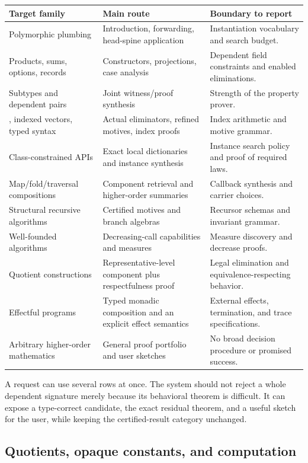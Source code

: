 \documentclass[11pt,letterpaper]{article}
\newcommand{\code}[1]{\texttt{\detokenize{#1}}}
\theoremstyle{definition}
\theoremstyle{remark}
\begin{document}
\begin{longtable}{@{}p{}p{}p{}@{}}
\toprule
Target family & Main route & Boundary to report\\
\midrule
\endhead
Polymorphic plumbing & Introduction, forwarding, head-spine application & Instantiation vocabulary and search budget.\\
Products, sums, options, records & Constructors, projections, case analysis & Dependent field constraints and enabled eliminations.\\
Subtypes and dependent pairs & Joint witness/proof synthesis & Strength of the property prover.\\
\code{Fin}, indexed vectors, typed syntax & Actual eliminators, refined motives, index proofs & Index arithmetic and motive grammar.\\
Class-constrained APIs & Exact local dictionaries and instance synthesis & Instance search policy and proof of required laws.\\
Map/fold/traversal compositions & Component retrieval and higher-order summaries & Callback synthesis and carrier choices.\\
Structural recursive algorithms & Certified motives and branch algebras & Recursor schemas and invariant grammar.\\
Well-founded algorithms & Decreasing-call capabilities and measures & Measure discovery and decrease proofs.\\
Quotient constructions & Representative-level component plus respectfulness proof & Legal elimination and equivalence-respecting behavior.\\
Effectful programs & Typed monadic composition and an explicit effect semantics & External effects, termination, and trace specifications.\\
Arbitrary higher-order mathematics & General proof portfolio and user sketches & No broad decision procedure or promised success.\\
\bottomrule
\end{longtable}

A request can use several rows at once. The system should not reject a whole dependent signature merely because its behavioral theorem is difficult. It can expose a type-correct candidate, the exact residual theorem, and a useful sketch for the user, while keeping the certified-result category unchanged.

\subsection{Quotients, opaque constants, and computation}
\end{document}
